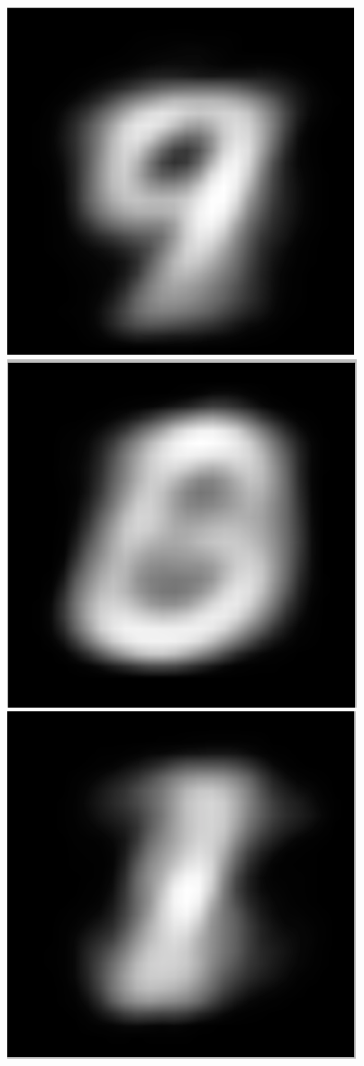 \documentclass[submit]{harvardml}
\begin{document}
	\begin{figure}[h]
		\includegraphics[scale=0.1]{./m3/0}
		\includegraphics[scale=0.1]{./m3/1}
		\includegraphics[scale=0.1]{./m3/2}
	\end{figure}
\end{document}

